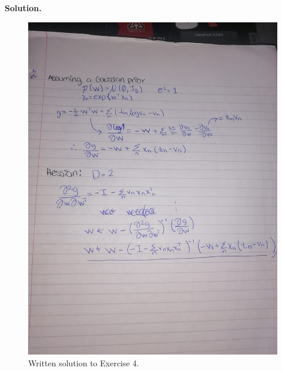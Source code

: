 \documentclass[10pt]{article}
\begin{document}
\begin{itemize}
{\bf Solution.}
\begin{figure}[H]
\begin{center}
\includegraphics[width=.7\textwidth]{figures/ex4.jpeg}
\caption{Written solution to Exercise 4.}
\end{center}
\end{figure}

\end{itemize}
\end{document}
